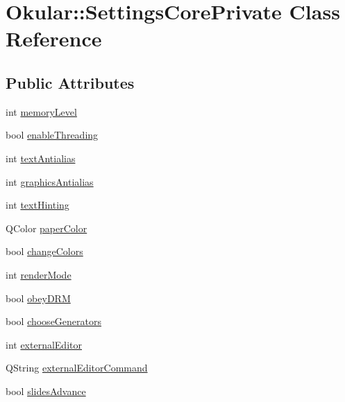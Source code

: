 \hypertarget{classOkular_1_1SettingsCorePrivate}{\section{Okular\+:\+:Settings\+Core\+Private Class Reference}
\label{classOkular_1_1SettingsCorePrivate}
}
\subsection*{Public Attributes}
\begin{DoxyCompactItemize}
\item 
int \hyperlink{classOkular_1_1SettingsCorePrivate_a904bfb6bd05666c2ba7d3d69b74f91ea}{memory\+Level}
\item 
bool \hyperlink{classOkular_1_1SettingsCorePrivate_ac5767e8816765ebbbb42facce4ac649c}{enable\+Threading}
\item 
int \hyperlink{classOkular_1_1SettingsCorePrivate_aabfb8b6638886cf90ebb5da026e64f50}{text\+Antialias}
\item 
int \hyperlink{classOkular_1_1SettingsCorePrivate_a7c39944a883c59a551e351d7d4260b6f}{graphics\+Antialias}
\item 
int \hyperlink{classOkular_1_1SettingsCorePrivate_a8492490de6581f4d098f56482f943c5e}{text\+Hinting}
\item 
Q\+Color \hyperlink{classOkular_1_1SettingsCorePrivate_ad7b5c7af2f0c3beb1de8ffa6eb419d55}{paper\+Color}
\item 
bool \hyperlink{classOkular_1_1SettingsCorePrivate_a779525d859d75bf8d158edfe7b59bd41}{change\+Colors}
\item 
int \hyperlink{classOkular_1_1SettingsCorePrivate_adee868b29bdba3ccd3c199b2ad05a0f9}{render\+Mode}
\item 
bool \hyperlink{classOkular_1_1SettingsCorePrivate_a7c937970be4909da5e6c87b808508ff7}{obey\+D\+R\+M}
\item 
bool \hyperlink{classOkular_1_1SettingsCorePrivate_af564ef01d5e733d826c719a8694e2031}{choose\+Generators}
\item 
int \hyperlink{classOkular_1_1SettingsCorePrivate_af0218eba4a88280bdba51f897a69dcbd}{external\+Editor}
\item 
Q\+String \hyperlink{classOkular_1_1SettingsCorePrivate_a42790939dfdac0ad0671710bce6aac67}{external\+Editor\+Command}
\item 
bool \hyperlink{classOkular_1_1SettingsCorePrivate_a2f5216596525d18888fe9ca9f50a149e}{slides\+Advance}

\end{DoxyCompactItemize}
